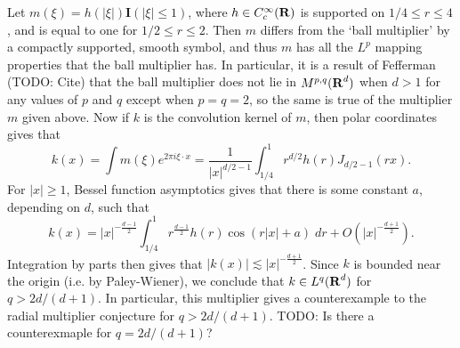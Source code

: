 
\begin{remark}
    Let $m(\xi) = h(|\xi|) \mathbf{I}(|\xi| \leq 1)$, where $h \in C_c^\infty(\operatorname{\mathbf{R}})$ is supported on $1/4 \leq r \leq 4$, and is equal to one for $1/2 \leq r \leq 2$. Then $m$ differs from the `ball multiplier' by a compactly supported, smooth symbol, and thus $m$ has all the $L^p$ mapping properties that the ball multiplier has. In particular, it is a result of Fefferman (TODO: Cite) that the ball multiplier does not lie in $M^{p,q}(\operatorname{\mathbf{R}}^d)$ when $d > 1$ for any values of $p$ and $q$ except when $p = q = 2$, so the same is true of the multiplier $m$ given above. Now if $k$ is the convolution kernel of $m$, then polar coordinates gives that
    \[ k(x) = \int m(\xi) e^{2 \pi i \xi \cdot x} = \frac{1}{|x|^{d/2 - 1}} \int_{1/4}^1 r^{d/2} h(r) J_{d/2-1}( r x ). \]
    For $|x| \geq 1$, Bessel function asymptotics gives that there is some constant $a$, depending on $d$, such that
    \[ k(x) = |x|^{-\frac{d-1}{2}} \int_{1/4}^1 r^{\frac{d-1}{2}} h(r) \cos(r |x| + a)\; dr + O \left( |x|^{-\frac{d+1}{2}} \right). \]
    Integration by parts then gives that $|k(x)| \lesssim |x|^{- \frac{d+1}{2}}$. Since $k$ is bounded near the origin (i.e. by Paley-Wiener), we conclude that $k \in L^q(\operatorname{\mathbf{R}}^d)$ for $q > 2d/(d+1)$. In particular, this multiplier gives a counterexample to the radial multiplier conjecture for $q > 2d/(d+1)$. TODO: Is there a counterexmaple for $q = 2d/(d+1)$?

\end{remark}
